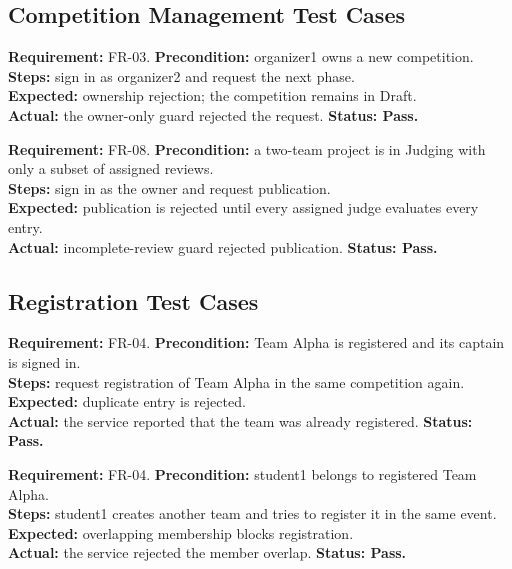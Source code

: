 \subsection{Competition Management Test Cases}
\begin{contentbox}
\textbf{Requirement:} FR-03. \textbf{Precondition:} organizer1 owns a new competition.\\
\textbf{Steps:} sign in as organizer2 and request the next phase.\\
\textbf{Expected:} ownership rejection; the competition remains in Draft.\\
\textbf{Actual:} the owner-only guard rejected the request. \textbf{Status: Pass.}
\end{contentbox}
\begin{contentbox}
\textbf{Requirement:} FR-08. \textbf{Precondition:} a two-team project is in Judging with only a subset of assigned reviews.\\
\textbf{Steps:} sign in as the owner and request publication.\\
\textbf{Expected:} publication is rejected until every assigned judge evaluates every entry.\\
\textbf{Actual:} incomplete-review guard rejected publication. \textbf{Status: Pass.}
\end{contentbox}
\subsection{Registration Test Cases}
\begin{contentbox}
\textbf{Requirement:} FR-04. \textbf{Precondition:} Team Alpha is registered and its captain is signed in.\\
\textbf{Steps:} request registration of Team Alpha in the same competition again.\\
\textbf{Expected:} duplicate entry is rejected.\\
\textbf{Actual:} the service reported that the team was already registered. \textbf{Status: Pass.}
\end{contentbox}
\begin{contentbox}
\textbf{Requirement:} FR-04. \textbf{Precondition:} student1 belongs to registered Team Alpha.\\
\textbf{Steps:} student1 creates another team and tries to register it in the same event.\\
\textbf{Expected:} overlapping membership blocks registration.\\
\textbf{Actual:} the service rejected the member overlap. \textbf{Status: Pass.}
\end{contentbox}

